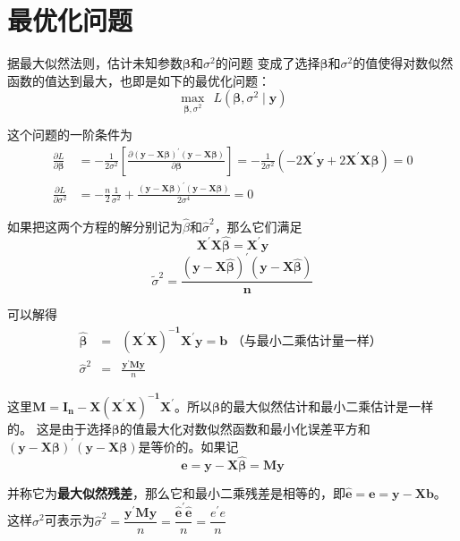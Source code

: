   \section{最优化问题}
	据最大似然法则，估计未知参数$ \boldsymbol{\beta} $和$ \sigma^{2} $的问题
	变成了选择$ \boldsymbol{\beta} $和$ \sigma^{2} $的值使得对数似然函数的值达到最大，也即是如下的最优化问题：
	$$ \max_{ \boldsymbol{\beta} , \sigma^{2}}  \ \ L \left( \boldsymbol{\beta}, \sigma^{2} \mid \boldsymbol{y} \right) $$
	
  这个问题的一阶条件为
	\begin{equation}
		\begin{aligned}
			\frac{\partial L}{\partial \boldsymbol{\beta} } 
				& =  -\frac{1}{2 \sigma^{2}}\left[\frac{\partial \boldsymbol{(y-X \beta)^{\prime}(y-X \beta)}}{\partial \boldsymbol{\beta}}\right]
				= - \frac{1}{2 \sigma^{2}} \left(-2 \boldsymbol{X^{\prime} y}+2 \boldsymbol{X^{\prime} X \beta}\right)=0 \\
				\frac{\partial L}{\partial \sigma^{2}} 
				& =  -\frac{n}{2} \frac{1}{\sigma^{2}}+\frac{\boldsymbol{(y-X \beta)^{\prime}(y-X \beta)}}{2 \sigma^{4}}=0 
		\end{aligned}
	\end{equation}

    如果把这两个方程的解分别记为$ \hat{\beta} $和$ \hat{\sigma}^{2} $，那么它们满足
	$$ \boldsymbol{ X^{\prime} X \hat{\beta}=X^{\prime} y } $$
	$$  \tilde{\sigma}^{2} = \boldsymbol{\frac{(y-X \hat{\beta})^{\prime}(y-X \hat{\beta})}{n} } $$
	
	可以解得
	\begin{eqnarray}
		\boldsymbol{\hat{\beta}} & = & \boldsymbol{\left(X^{\prime} X\right)^{-1} X^{\prime} y=b} \text{ （与最小二乘估计量一样） } \\
		\hat{\sigma}^{2} & = & \frac{ \boldsymbol{y^{\prime} M y} }{n}
	\end{eqnarray}

	这里$ \boldsymbol{M = I_{n} - X\left ( X^{\prime}  X \right )^{-1}X^{\prime }} $。所以$ \boldsymbol{\beta} $的最大似然估计和最小二乘估计是一样的。
	这是由于选择$ \boldsymbol{\beta} $的值最大化对数似然函数和最小化误差平方和
	$ \boldsymbol{\left ( y - X \beta \right)^{\prime} \left ( y - X \beta \right )} $是等价的。如果记
	$$ \boldsymbol{\hat{e} = y - X \hat{\beta} = My} $$

	并称它为\textbf{最大似然残差}，那么它和最小二乘残差是相等的，即$ \boldsymbol{\hat{e} = e = y - X b} $。
	这样$ \sigma^{2} $可表示为$ \hat{\sigma}^{2} = \dfrac{ \boldsymbol{y^{\prime}My} }{n} 
			 = \dfrac{ \boldsymbol{\hat{e}^{\prime}\hat{e}} }{n} 
			 = \dfrac{e^{\prime}e}{n} $

